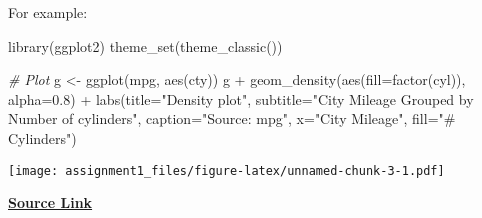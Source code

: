 \documentclass[
]{article}
\newenvironment{Shaded}{\begin{snugshade}}{\end{snugshade}}
\newcommand{\AttributeTok}[1]{\textcolor[rgb]{0.77,0.63,0.00}{#1}}
\newcommand{\CommentTok}[1]{\textcolor[rgb]{0.56,0.35,0.01}{\textit{#1}}}
\newcommand{\FloatTok}[1]{\textcolor[rgb]{0.00,0.00,0.81}{#1}}
\newcommand{\FunctionTok}[1]{\textcolor[rgb]{0.00,0.00,0.00}{#1}}
\newcommand{\NormalTok}[1]{#1}
\newcommand{\OtherTok}[1]{\textcolor[rgb]{0.56,0.35,0.01}{#1}}
\newcommand{\SpecialCharTok}[1]{\textcolor[rgb]{0.00,0.00,0.00}{#1}}
\newcommand{\StringTok}[1]{\textcolor[rgb]{0.31,0.60,0.02}{#1}}
\begin{document}
For example:

\begin{Shaded}
\begin{Highlighting}[]
\FunctionTok{library}\NormalTok{(ggplot2)}
\FunctionTok{theme\_set}\NormalTok{(}\FunctionTok{theme\_classic}\NormalTok{())}

\CommentTok{\# Plot}
\NormalTok{g }\OtherTok{\textless{}{-}} \FunctionTok{ggplot}\NormalTok{(mpg, }\FunctionTok{aes}\NormalTok{(cty))}
\NormalTok{g }\SpecialCharTok{+} \FunctionTok{geom\_density}\NormalTok{(}\FunctionTok{aes}\NormalTok{(}\AttributeTok{fill=}\FunctionTok{factor}\NormalTok{(cyl)), }\AttributeTok{alpha=}\FloatTok{0.8}\NormalTok{) }\SpecialCharTok{+} 
    \FunctionTok{labs}\NormalTok{(}\AttributeTok{title=}\StringTok{"Density plot"}\NormalTok{, }
         \AttributeTok{subtitle=}\StringTok{"City Mileage Grouped by Number of cylinders"}\NormalTok{,}
         \AttributeTok{caption=}\StringTok{"Source: mpg"}\NormalTok{,}
         \AttributeTok{x=}\StringTok{"City Mileage"}\NormalTok{,}
         \AttributeTok{fill=}\StringTok{"\# Cylinders"}\NormalTok{)}
\end{Highlighting}
\end{Shaded}

\texttt{[image: assignment1\_files/figure-latex/unnamed-chunk-3-1.pdf]}

\href{https://www.geeksforgeeks.org/}{\textbf{Source Link}}
\end{document}
